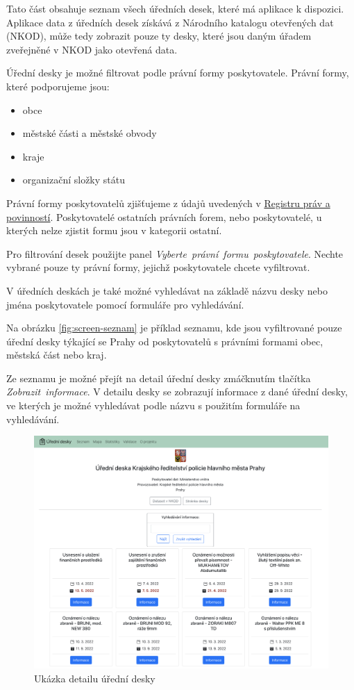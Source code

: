 Tato část obsahuje seznam všech úředních desek, které má aplikace k
dispozici. Aplikace data z úředních desek získává z Národního katalogu
otevřených dat (NKOD), může tedy zobrazit pouze ty desky, které jsou
daným úřadem zveřejněné v NKOD jako otevřená data.

Úřední desky je možné filtrovat podle právní formy poskytovatele. Právní
formy, které podporujeme jsou: 
\begin{itemize}
    \item obce
    \item městské části a městské obvody
    \item kraje
    \item organizační složky státu
\end{itemize}

Právní formy poskytovatelů zjišťujeme z údajů uvedených v
\href{https://www.szrcr.cz/cs/registr-prav-a-povinnosti}{Registru práv a
povinností}. Poskytovatelé ostatních právních forem, nebo poskytovatelé,
u kterých nelze zjistit formu jsou v kategorii ostatní.

Pro filtrování desek použijte panel
\textit{Vyberte\ právní\ formu\ poskytovatele}. Nechte vybrané pouze ty
právní formy, jejichž poskytovatele chcete vyfiltrovat.

V úředních deskách je také možné vyhledávat na základě názvu desky nebo
jména poskytovatele pomocí formuláře pro vyhledávání.

Na obrázku \ref{fig:screen-seznam} je příklad seznamu, kde jsou vyfiltrované pouze úřední desky týkající se
Prahy od poskytovatelů s právními formami obec, městská část nebo kraj.

Ze seznamu je možné přejít na detail úřední desky zmáčknutím tlačítka \\
\textit{Zobrazit\ informace}. V detailu desky se zobrazují informace z
dané úřední desky, ve kterých je možné vyhledávat podle názvu s použitím
formuláře na vyhledávání.

\begin{figure}
\centering
\includegraphics[width=\textwidth]{cs/obrazky/screenshots/detail.png}
\caption{Ukázka detailu úřední desky}
\label{fig:screen-detail}
\end{figure}


